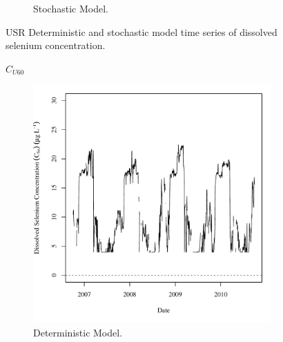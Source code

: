 \begin{linenumbers}
\begin{landscape}
\begin{figure}
\begin{subfigure}{0.7\textwidth}
			\caption{Stochastic Model.}
		\end{subfigure}
		\caption{USR Deterministic and stochastic model time series of dissolved selenium concentration.}
	\end{figure}
\end{landscape}

\subfiguremid
\begin{landscape}
	\begin{figure}
		$ C_{U60} $
		\begin{subfigure}{0.7\textwidth}
			\centering
			\includegraphics[width=\tableCustomSize]{"Figures/Results_USR/Deterministic/c TS TIM"}
			\caption{Deterministic Model.}
		\end{subfigure}%
		\begin{subfigure}{0.7\textwidth}
			\centering

\end{subfigure}
\end{figure}
\end{landscape}
\end{linenumbers}
